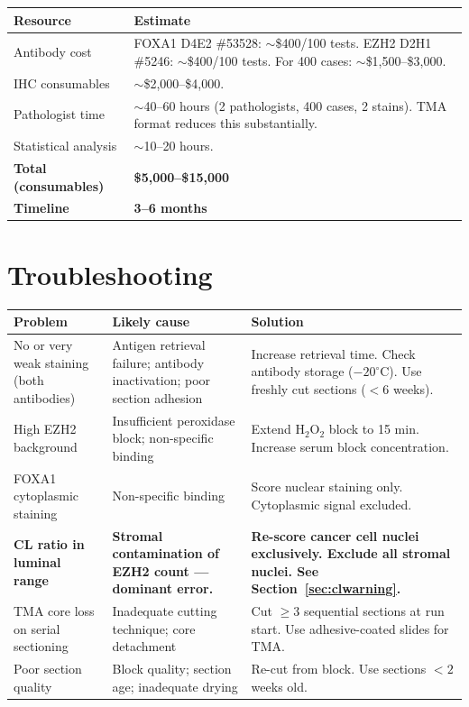 \documentclass[11pt, a4paper]{article}
\begin{document}
\begin{center}
\begin{tabular}{p{5cm}p{7.5cm}}
\toprule
\textbf{Resource} & \textbf{Estimate} \\
\midrule
Antibody cost &
FOXA1 D4E2 \#53528:
${\sim}$\$400/100 tests.
EZH2 D2H1 \#5246:
${\sim}$\$400/100 tests.
For 400 cases:
${\sim}$\$1,500--\$3,000. \\[0.3em]
IHC consumables &
${\sim}$\$2,000--\$4,000. \\[0.3em]
Pathologist time &
${\sim}$40--60 hours
(2 pathologists, 400 cases,
2 stains). TMA format
reduces this substantially. \\[0.3em]
Statistical analysis &
${\sim}$10--20 hours. \\[0.3em]
\textbf{Total (consumables)} &
\textbf{\$5,000--\$15,000} \\[0.3em]
\textbf{Timeline} &
\textbf{3--6 months} \\
\bottomrule
\end{tabular}
\end{center}

\section{Troubleshooting}

\begin{center}
\begin{tabular}{p{3.2cm}p{4cm}p{5.8cm}}
\toprule
\textbf{Problem} &
\textbf{Likely cause} &
\textbf{Solution} \\
\midrule
No or very weak staining
(both antibodies) &
Antigen retrieval failure;
antibody inactivation;
poor section adhesion &
Increase retrieval time.
Check antibody storage ($-20^\circ$C).
Use freshly cut sections ($<6$ weeks).\\[0.4em]
High EZH2 background &
Insufficient peroxidase block;
non-specific binding &
Extend H$_2$O$_2$ block to 15 min.
Increase serum block
concentration.\\[0.4em]
FOXA1 cytoplasmic
staining &
Non-specific binding &
Score nuclear staining only.
Cytoplasmic signal excluded.\\[0.4em]
\textbf{CL ratio in
luminal range} &
\textbf{Stromal contamination
of EZH2 count ---
dominant error.} &
\textbf{Re-score cancer cell
nuclei exclusively.
Exclude all stromal nuclei.
See Section~\ref{sec:clwarning}.}\\[0.4em]
TMA core loss on
serial sectioning &
Inadequate cutting technique;
core detachment &
Cut $\geq 3$ sequential sections
at run start. Use adhesive-coated
slides for TMA.\\[0.4em]
Poor section quality &
Block quality; section age;
inadequate drying &
Re-cut from block.
Use sections $<2$ weeks old.\\
\bottomrule
\end{tabular}
\end{center}
\end{document}
